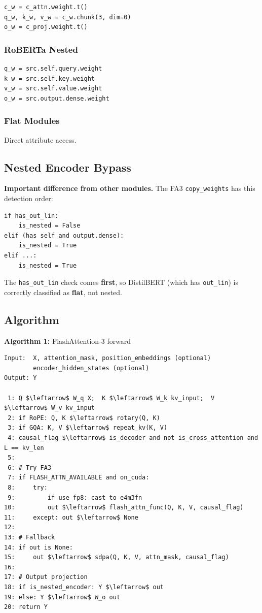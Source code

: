\begin{lstlisting}
c_w = c_attn.weight.t()
q_w, k_w, v_w = c_w.chunk(3, dim=0)
o_w = c_proj.weight.t()
\end{lstlisting}

\subsubsection{RoBERTa Nested}

\begin{lstlisting}
q_w = src.self.query.weight
k_w = src.self.key.weight
v_w = src.self.value.weight
o_w = src.output.dense.weight
\end{lstlisting}

\subsubsection{Flat Modules}

Direct attribute access.

\subsection{Nested Encoder Bypass}

\textbf{Important difference from other modules.} The FA3 \texttt{copy\_weights} has 
this detection order:

\begin{lstlisting}
if has_out_lin:
    is_nested = False
elif (has self and output.dense):
    is_nested = True
elif ...:
    is_nested = True
\end{lstlisting}

The \texttt{has\_out\_lin} check comes \textbf{first}, so DistilBERT (which has \texttt{out\_lin}) 
is correctly classified as \textbf{flat}, not nested.

\subsection{Algorithm}

\textbf{Algorithm 1:} FlashAttention-3 forward
\begin{lstlisting}
Input:  X, attention_mask, position_embeddings (optional)
        encoder_hidden_states (optional)
Output: Y

 1: Q $\leftarrow$ W_q X;  K $\leftarrow$ W_k kv_input;  V $\leftarrow$ W_v kv_input
 2: if RoPE: Q, K $\leftarrow$ rotary(Q, K)
 3: if GQA: K, V $\leftarrow$ repeat_kv(K, V)
 4: causal_flag $\leftarrow$ is_decoder and not is_cross_attention and L == kv_len
 5:
 6: # Try FA3
 7: if FLASH_ATTN_AVAILABLE and on_cuda:
 8:     try:
 9:         if use_fp8: cast to e4m3fn
10:         out $\leftarrow$ flash_attn_func(Q, K, V, causal_flag)
11:     except: out $\leftarrow$ None
12:
13: # Fallback
14: if out is None:
15:     out $\leftarrow$ sdpa(Q, K, V, attn_mask, causal_flag)
16:
17: # Output projection
18: if is_nested_encoder: Y $\leftarrow$ out
19: else: Y $\leftarrow$ W_o out
20: return Y
\end{lstlisting}

